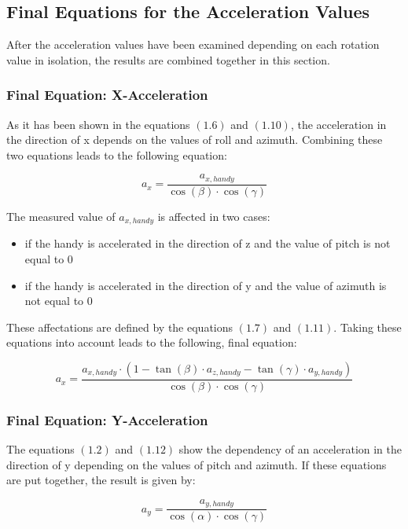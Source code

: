 \documentclass[12pt, a4paper, oneside, british]{article}
\begin{document}
\subsection{Final Equations for the Acceleration Values}
After the acceleration values have been examined depending on each rotation
value in isolation, the results are combined together in this section.

\subsubsection{Final Equation: X-Acceleration }
As it has been shown in the equations $(1.6)$ and $(1.10)$, the acceleration in
the direction of x depends on the values of roll and azimuth. Combining these
two equations leads to the following equation:

\begin{equation}
a_x = \frac{a_{x, handy}}{\cos(\beta) \cdot \cos(\gamma)}
\end{equation}

\noindent The measured value of $a_{x,handy}$ is affected in two cases:
\begin{itemize}
\item{if the handy is accelerated in the direction of z and the value of pitch is not equal to 0}
\item{if the handy is accelerated in the direction of y and the value of azimuth is not equal to 0}
\end{itemize}
These affectations are defined by the equations $(1.7)$ and $(1.11)$. Taking
these equations into account leads to the following, final equation:

\begin{equation}
a_x = \frac{a_{x, handy} \cdot (1 - \tan(\beta) \cdot a_{z, handy}
- \tan(\gamma) \cdot a_{y, handy})}{\cos(\beta) \cdot \cos(\gamma)}
\end{equation}

\subsubsection{Final Equation: Y-Acceleration }
The equations $(1.2)$ and $(1.12)$ show the dependency of an acceleration in the
direction of y depending on the values of pitch and azimuth. If these equations
are put together, the result is given by:

\begin{equation}
a_y = \frac{a_{y, handy}}{\cos(\alpha) \cdot \cos(\gamma)}
\end{equation}
\end{document}
